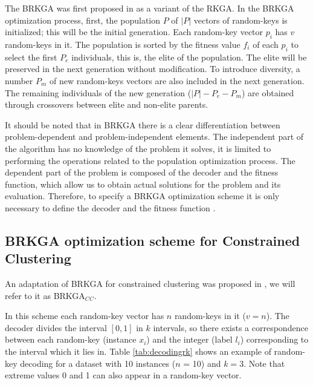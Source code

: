 The \acf{BRKGA} was first proposed in \cite{gonccalves2011biased} as a variant of the \acs{RKGA}. In the \acs{BRKGA} optimization process, first, the population $P$ of $|P|$ vectors of random-keys is initialized; this will be the initial generation. Each random-key vector $p_i$ has $v$ random-keys in it. The population is sorted by the fitness value $f_i$ of each $p_i$ to select the first $P_e$ individuals, this is, the elite of the population. The elite will be preserved in the next generation without modification. To introduce diversity, a number $P_m$ of new random-keys vectors are also included in the next generation. The remaining individuals of the new generation ($|P| - P_e - P_m$) are obtained through crossovers between elite and non-elite parents.

It should be noted that in \acs{BRKGA} there is a clear differentiation between problem-dependent and problem-independent elements. The independent part of the algorithm has no knowledge of the problem it solves, it is limited to performing the operations related to the population optimization process. The dependent part of the problem is composed of the decoder and the fitness function, which allow us to obtain actual solutions for the problem and its evaluation. Therefore, to specify a \acs{BRKGA} optimization scheme it is only necessary to define the decoder and the fitness function \cite{gonccalves2011biased}.

\subsection{BRKGA optimization scheme for Constrained Clustering} \label{sec:AdaptationofBRKGA}

An adaptation of \acs{BRKGA} for constrained clustering was proposed in \cite{de2017comparison}, we will refer to it as \acs{BRKGA}$_{CC}$.

In this scheme each random-key vector has $n$ random-keys in it ($v = n$). The decoder divides the interval $[0,1]$ in $k$ intervals, so there exists a correspondence between each random-key (instance $x_i$) and the integer (label $l_i$) corresponding to the interval which it lies in. Table \ref{tab:decodingrk} shows an example of random-key decoding for a dataset with 10 instances ($n$ = 10) and $k = 3$. Note that extreme values 0 and 1 can also appear in a random-key vector.

